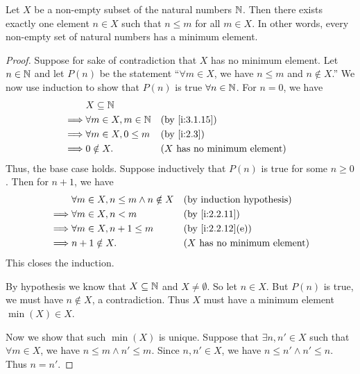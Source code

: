 \begin{prop}\label{i:8.1.4}
  Let \(X\) be a non-empty subset of the natural numbers \(\mathbb{N}\).
  Then there exists exactly one element \(n \in X\) such that \(n \leq m\) for all \(m \in X\).
  In other words, every non-empty set of natural numbers has a minimum element.
\end{prop}

\begin{proof}
  Suppose for sake of contradiction that \(X\) has no minimum element.
  Let \(n \in \mathbb{N}\) and let \(P(n)\) be the statement ``\(\forall m \in X\), we have \(n \leq m\) and \(n \notin X\).''
  We now use induction to show that \(P(n)\) is true \(\forall n \in \mathbb{N}\).
  For \(n = 0\), we have
  \begin{align*}
             & X \subseteq \N                                                       \\
    \implies & \forall m \in X, m \in \N &  & \by{i:3.1.15}                         \\
    \implies & \forall m \in X, 0 \leq m &  & \by{i:2.3}                            \\
    \implies & 0 \notin X.               &  & \text{(\(X\) has no minimum element)}
  \end{align*}
  Thus, the base case holds.
  Suppose inductively that \(P(n)\) is true for some \(n \geq 0\).
  Then for \(n + 1\), we have
  \begin{align*}
             & \forall m \in X, n \leq m \land n \notin X &  & \byIH                                 \\
    \implies & \forall m \in X, n < m                     &  & \by{i:2.2.11}                         \\
    \implies & \forall m \in X, n + 1 \leq m              &  & \by{i:2.2.12}[e]                      \\
    \implies & n + 1 \notin X.                            &  & \text{(\(X\) has no minimum element)}
  \end{align*}
  This closes the induction.

  By hypothesis we know that \(X \subseteq \mathbb{N}\) and \(X \neq \emptyset\).
  So let \(n \in X\).
  But \(P(n)\) is true, we must have \(n \notin X\), a contradiction.
  Thus \(X\) must have a minimum element \(\min(X) \in X\).

  Now we show that such \(\min(X)\) is unique.
  Suppose that \(\exists n, n' \in X\) such that \(\forall m \in X\), we have \(n \leq m \land n' \leq m\).
  Since \(n, n' \in X\), we have \(n \leq n' \land n' \leq n\).
  Thus \(n = n'\).
\end{proof}

